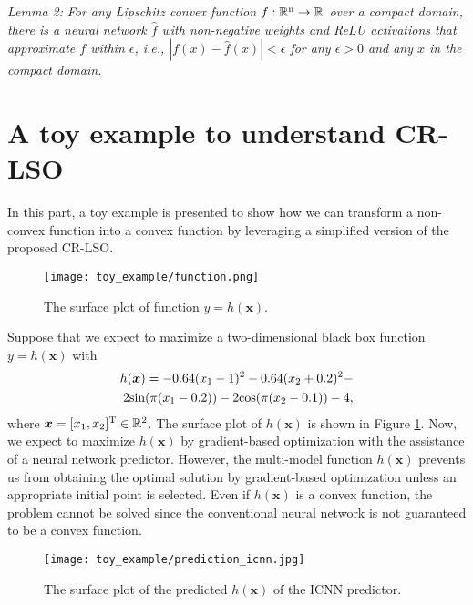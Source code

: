 \documentclass[10pt,twocolumn,letterpaper]{article}
\begin{document}
\emph{Lemma 2:} \emph{For any Lipschitz convex function $f:  \mathbb{R}^{\rm n} \rightarrow \mathbb{R}$ over a compact domain, there is a neural network $\hat{f}$ with non-negative weights and ReLU activations that approximate $f$ within $\epsilon$, i.e., $|f(x) - \hat{f}(x)| < \epsilon$ for any $\epsilon > 0$ and any $x$ in the compact domain.}
\section{A toy example to understand CR-LSO}
In this part, a toy example is presented to show how we can transform a non-convex function into a convex function by leveraging a simplified version of the proposed CR-LSO. 
\begin{figure}[htbp]
	\centering
	\texttt{[image: toy\_example/function.png]}
	\caption{The surface plot of function $y = h(\boldsymbol{x})$.}
	\label{fig:target_function}
\end{figure}
Suppose that we expect to maximize a two-dimensional black box function $y=h(\boldsymbol{x})$ with
\begin{align}
	\begin{split}
		h(\boldsymbol{x}) = -0.64(x_{1}-1)^{2} -0.64(x_{2}+0.2)^{2} - \\
		2{\rm sin}(\pi(x_{1}-0.2)) - 2{\rm cos}(\pi(x_{2}-0.1)) - 4,
	\end{split}
\end{align}
where $\boldsymbol{x} = [x_{1},x_{2}]^{\rm T} \in \mathbb{R}^{2}$. The surface plot of $h(\boldsymbol{x})$ is shown in Figure \ref{fig:target_function}.
Now, we expect to maximize $h(\boldsymbol{x})$ by gradient-based optimization with the assistance of a neural network predictor. However, the multi-model
function $h(\boldsymbol{x})$ prevents us from obtaining the optimal solution by gradient-based optimization unless an appropriate initial point is selected. Even if $h(\boldsymbol{x})$ is a convex function, the problem cannot be solved since the conventional neural network is not guaranteed to be a convex function. 
\begin{figure}[htbp]
	\centering
	\texttt{[image: toy\_example/prediction\_icnn.jpg]}
	\caption{The surface plot of the predicted $h(\boldsymbol{x})$ of the ICNN predictor.}
	\label{fig:prediction_icnn}
\end{figure}
\end{document}
